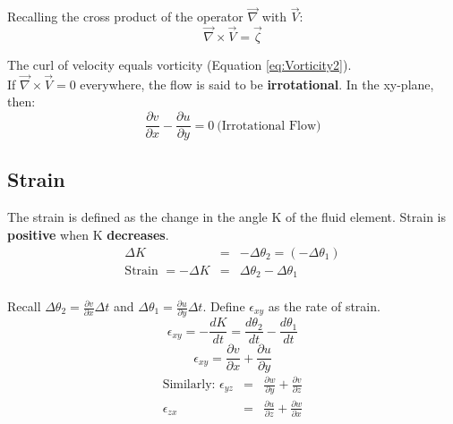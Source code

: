 \documentclass[draft=false, titlepage]{article}
\newcommand{\gradient}{\vec{\nabla}}
\newcommand{\partialfrac}[2]{\frac{\partial #1}{\partial #2}}
\begin{document}

Recalling the cross product of the operator $\gradient$ with $\vec{V}$:
\begin{equation}
    \gradient \times \vec{V} = \vec{\zeta}
    \label{eq:Vorticity2}
\end{equation}

The curl of velocity equals vorticity (Equation \ref{eq:Vorticity2}).\\
If $\gradient \times \vec{V} = 0$ everywhere, the flow is said to be \textbf{irrotational}. In the xy-plane, then:
\begin{equation}
    \partialfrac{v}{x} - \partialfrac{u}{y} = 0\ \text{(Irrotational Flow)}
    \label{eq:IrrotationalCondition}
\end{equation}

\subsection{Strain} %
The strain is defined as the change in the angle K of the fluid element. Strain is \textbf{positive} when K \textbf{decreases}.
\begin{equation*}
    \begin{array}{rcl}
    \Delta K &=& -\Delta \theta_2 = (-\Delta \theta_1)\\
    \text{Strain } = -\Delta K &=& \Delta \theta_2 - \Delta \theta_1 \\
    \end{array}
\end{equation*}

Recall $\Delta \theta_2 = \partialfrac{v}{x} \Delta t$ and $\Delta \theta_1 = \partialfrac{u}{y} \Delta t$. Define $\epsilon_{xy}$ as the rate of strain.
\begin{equation*}
    \epsilon_{xy} = -\frac{dK}{dt} = \frac{d\theta_2}{dt} - \frac{d\theta_1}{dt}
\end{equation*}
\begin{equation}
    \epsilon_{xy} = \partialfrac{v}{x} + \partialfrac{u}{y}
    \label{eq:Strain}
\end{equation}
\begin{equation*}
\begin{array}{rcl}
    \text{Similarly: } \epsilon_{yz} &=& \partialfrac{w}{y} + \partialfrac{v}{z}\\
    \epsilon_{zx} &=& \partialfrac{u}{z} + \partialfrac{w}{x}\\
    \end{array}
\end{equation*}
\end{document}
